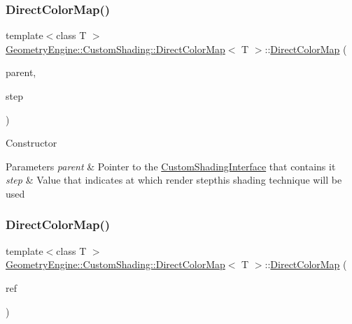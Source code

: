 \subsubsection{\texorpdfstring{DirectColorMap()}{DirectColorMap()}\hspace{0.1cm}{\footnotesize\ttfamily [1/2]}}
{\footnotesize\ttfamily template$<$class T $>$ \\
\mbox{\hyperlink{class_geometry_engine_1_1_custom_shading_1_1_direct_color_map}{Geometry\+Engine\+::\+Custom\+Shading\+::\+Direct\+Color\+Map}}$<$ T $>$\+::\mbox{\hyperlink{class_geometry_engine_1_1_custom_shading_1_1_direct_color_map}{Direct\+Color\+Map}} (\begin{DoxyParamCaption}\item[{\mbox{\hyperlink{class_geometry_engine_1_1_custom_shading_1_1_custom_shading_interface}{Custom\+Shading\+Interface}} $\ast$}]{parent,  }\item[{\mbox{\hyperlink{namespace_geometry_engine_1_1_custom_shading_a2dc236a5b567da5099069ce2b2be5609}{Custom\+Shading\+Steps}}}]{step }\end{DoxyParamCaption})\hspace{0.3cm}{\ttfamily [inline]}}

Constructor 
\begin{DoxyParams}{Parameters}
{\em parent} & Pointer to the \mbox{\hyperlink{class_geometry_engine_1_1_custom_shading_1_1_custom_shading_interface}{Custom\+Shading\+Interface}} that contains it \\
\hline
{\em step} & Value that indicates at which render stepthis shading technique will be used \\
\hline
\end{DoxyParams}
\mbox{\label{class_geometry_engine_1_1_custom_shading_1_1_direct_color_map_a3d5033ee5a9ab64ebed320a28735cac7}} 
\subsubsection{\texorpdfstring{DirectColorMap()}{DirectColorMap()}\hspace{0.1cm}{\footnotesize\ttfamily [2/2]}}
{\footnotesize\ttfamily template$<$class T $>$ \\
\mbox{\hyperlink{class_geometry_engine_1_1_custom_shading_1_1_direct_color_map}{Geometry\+Engine\+::\+Custom\+Shading\+::\+Direct\+Color\+Map}}$<$ T $>$\+::\mbox{\hyperlink{class_geometry_engine_1_1_custom_shading_1_1_direct_color_map}{Direct\+Color\+Map}} (\begin{DoxyParamCaption}\item[{const \mbox{\hyperlink{class_geometry_engine_1_1_custom_shading_1_1_custom_shading_step}{Custom\+Shading\+Step}} \&}]{ref }\end{DoxyParamCaption})\hspace{0.3cm}{\ttfamily [inline]}}

